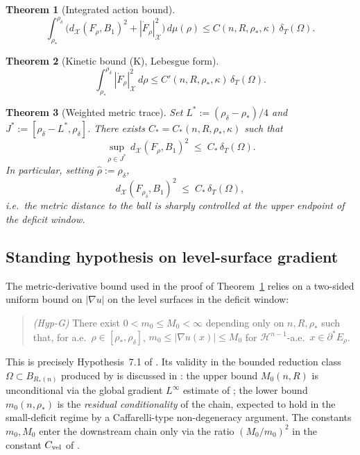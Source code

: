 \documentclass[11pt]{article}
\newtheorem{theorem}{Theorem}[section]
\theoremstyle{definition}
\newcommand{\Om}{\Omega}
\newcommand{\rstar}{\rho_{*}}
\newcommand{\rhad}{\widehat\rho}
\newcommand{\X}{\mathcal X}
\begin{document}
\begin{theorem}[Integrated action bound]\label{thm:52int}
\begin{equation}\label{eq:52int}
   \int_{\rstar}^{\rho_\delta}\bigl(d_\X(F_\rho,B_1)^2+|\dot F_\rho|_\X^2\bigr)\,d\mu(\rho)
   \le C(n,R,\rstar,\kappa)\,\delta_T(\Om).
\end{equation}
\end{theorem}

\begin{theorem}[Kinetic bound (K), Lebesgue form]\label{thm:K}
\begin{equation}\label{eq:K}
   \int_{\rstar}^{\rho_\delta}|\dot F_\rho|_\X^2\,d\rho
   \le C'(n,R,\rstar,\kappa)\,\delta_T(\Om).
\end{equation}
\end{theorem}

\begin{theorem}[Weighted metric trace]\label{thm:trace}
Set $L^*:=(\rho_\delta-\rstar)/4$ and
$J^*:=[\rho_\delta-L^*,\rho_\delta]$.  There exists $C_*=C_*(n,R,\rstar,\kappa)$
such that
\begin{equation}\label{eq:trace-uniform}
   \sup_{\rho\in J^*}\,d_\X(F_\rho,B_1)^2\;\le\;C_*\,\delta_T(\Om).
\end{equation}
In particular, setting $\rhad:=\rho_\delta$,
\begin{equation}\label{eq:trace-endpoint}
   d_\X(F_{\rho_\delta},B_1)^2\;\le\;C_*\,\delta_T(\Om),
\end{equation}
i.e.\ the metric distance to the ball is sharply controlled at the
upper endpoint of the deficit window.
\end{theorem}

\subsection{Standing hypothesis on level-surface gradient}\label{ssec:hypG}

The metric-derivative bound used in the proof of
Theorem~\ref{thm:52int} relies on a two-sided uniform bound on
$|\nabla u|$ on the level surfaces in the deficit window:

\begin{quote}
\emph{(Hyp-G)} There exist $0<m_0\le M_0<\infty$ depending only on
$n,R,\rstar$ such that, for a.e.\ $\rho\in[\rstar,\rho_\delta]$,
$m_0\le|\nabla u(x)|\le M_0$ for $\mathcal H^{n-1}$-a.e.\
$x\in\partial^*E_\rho$.
\end{quote}

This is precisely Hypothesis~7.1 of \cite{LevelSetIdentity}.  Its
validity in the bounded reduction class $\Om\subset B_{R_*(n)}$
produced by \cite[Lemma~5.3]{GlobalAssembly} is discussed in
\cite[Remark~7.2]{LevelSetIdentity}: the upper bound $M_0(n,R)$ is
unconditional via the global gradient $L^{\infty}$ estimate of
\cite{CianchiMaz'ya2011}; the lower bound $m_0(n,\rstar)$ is the
\emph{residual conditionality} of the chain, expected to hold in the
small-deficit regime by a Caffarelli-type non-degeneracy argument.
The constants $m_0,M_0$ enter the downstream chain only via the
ratio $(M_0/m_0)^2$ in the constant $C_{\rm vel}$ of
\cite[Cor.~7.4]{LevelSetIdentity}.
\end{document}
